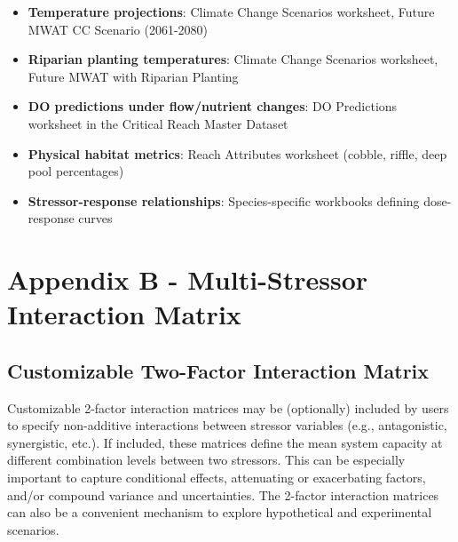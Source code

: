 \documentclass[
  letterpaper,
  DIV=11,
  numbers=noendperiod]{scrreprt}
\providecommand{\tightlist}{%
  \setlength{\itemsep}{0pt}\setlength{\parskip}{0pt}}
\begin{document}

\begin{itemize}
\tightlist
\item
  \textbf{Temperature projections}: Climate Change Scenarios worksheet,
  Future MWAT CC Scenario (2061-2080)
\item
  \textbf{Riparian planting temperatures}: Climate Change Scenarios
  worksheet, Future MWAT with Riparian Planting
\item
  \textbf{DO predictions under flow/nutrient changes}: DO Predictions
  worksheet in the Critical Reach Master Dataset
\item
  \textbf{Physical habitat metrics}: Reach Attributes worksheet (cobble,
  riffle, deep pool percentages)
\item
  \textbf{Stressor-response relationships}: Species-specific workbooks
  defining dose-response curves
\end{itemize}

\chapter*{Appendix B - Multi-Stressor Interaction
Matrix}\label{appendix-b---multi-stressor-interaction-matrix}


\section*{Customizable Two-Factor Interaction
Matrix}\label{customizable-two-factor-interaction-matrix}


Customizable 2-factor interaction matrices may be (optionally) included
by users to specify non-additive interactions between stressor variables
(e.g., antagonistic, synergistic, etc.). If included, these matrices
define the mean system capacity at different combination levels between
two stressors. This can be especially important to capture conditional
effects, attenuating or exacerbating factors, and/or compound variance
and uncertainties. The 2-factor interaction matrices can also be a
convenient mechanism to explore hypothetical and experimental scenarios.
\end{document}
